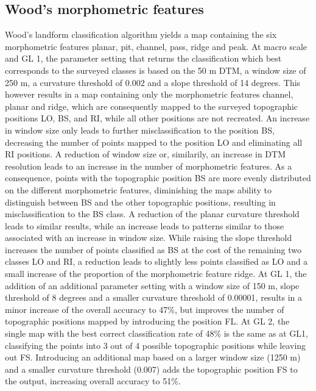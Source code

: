 \documentclass[final,1p,times,twocolumn,authoryear]{elsarticle}
\begin{document}
\subsection{Wood's morphometric features}
Wood's landform classification algorithm yields a map containing the six morphometric features planar, pit, channel, pass, ridge and peak. 
At macro scale and GL 1, the parameter setting that returns the classification which best corresponds to the surveyed classes is based on the 50 m DTM, a window size of 250 m, a curvature threshold of 0.002 and a slope threshold of 14 degrees. This however results in a map containing only the morphometric features channel, planar and ridge, which are consequently mapped to the surveyed topographic positions LO, BS, and RI, while all other positions are not recreated. An increase in window size only leads to further misclassification to the position BS, decreasing the number of points mapped to the position LO and eliminating all RI positions. A reduction of window size or, similarily, an increase in DTM resolution leads to an increase in the number of morphometric features. As a consequence, points with the topographic position BS are more evenly distributed on the different morphometric features, diminishing the maps ability to distinguish between BS and the other topographic positions, resulting in misclassification to the BS class. A reduction of the planar curvature threshold leads to similar results, while an increase leads to patterns similar to those associated with an increase in window size. While raising the slope threshold increases the number of points classified as BS at the cost of the remaining two classes LO and RI, a reduction leads to slightly less points classified as LO and a small increase of the proportion of the morphometric feature ridge. At GL 1, the addition of an additional parameter setting with a window size of 150 m, slope threshold of 8 degrees and a smaller curvature threshold of 0.00001, results in a minor increase of the overall accuracy to 47\%, but improves the number of topographic positions mapped by introducing the position FL. At GL 2, the single map with the best correct classification rate of 48\% is the same as at GL1, classifying the points into 3 out of 4 possible  topographic positions while leaving out FS. Introducing an additional map based on a larger window size (1250 m) and a smaller curvature threshold (0.007) adds the topographic position FS to the output, increasing overall accuracy to 51\%.
\end{document}
